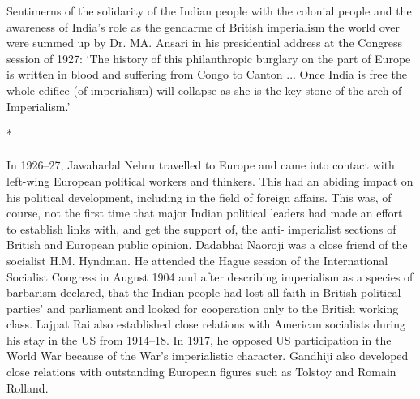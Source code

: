 \begin{multicols}{2}
Sentimerns of the solidarity of the Indian people with the colonial people and the awareness of India's role as the gendarme of British imperialism the world over were summed up by Dr. MA. Ansari in his presidential address at the Congress session of 1927: `The history of this philanthropic burglary on the part of Europe is written in blood and suffering from Congo to Canton ... Once India is free the whole edifice (of imperialism) will collapse as she is the key-stone of the arch of Imperialism.'

\begin{center}*\end{center}

\paragraph*{}

In 1926--27, Jawaharlal Nehru travelled to Europe and came into contact with left-wing European political workers and thinkers. This had an abiding impact on his political development, including in the field of foreign affairs. This was, of course, not the first time that major Indian political leaders had made an effort to establish links with, and get the support of, the anti- imperialist sections of British and European public opinion. Dadabhai Naoroji was a close friend of the socialist H.M. Hyndman. He attended the Hague session of the International Socialist Congress in August 1904 and after describing imperialism as a species of barbarism declared, that the Indian people had lost all faith in British political parties' and parliament and looked for cooperation only to the British working class. Lajpat Rai also established close relations with American socialists during his stay in the US from 1914--18. In 1917, he opposed US participation in the World War because of the War's imperialistic character. Gandhiji also developed close relations with outstanding European figures such as Tolstoy and Romain Rolland. 


\end{multicols}
